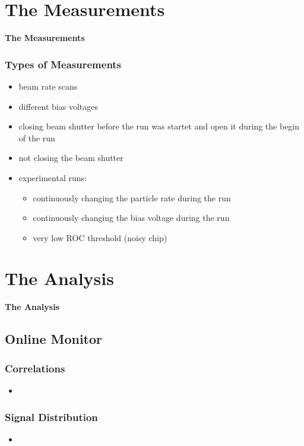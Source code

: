 \documentclass[9pt]{beamer}
\begin{document}
\section{The Measurements}
\begin{frame}
	\begin{alertblock}{
		\begin{center}
			\Large{\textbf{The Measurements}}
		\end{center}}
	\end{alertblock}
\end{frame}
\begin{frame}
	\frametitle{Types of Measurements}
	\begin{itemize}
		\item beam rate scans
		\item different bias voltages
		\item closing beam shutter before the run was startet and open it during the begin of the run
		\item not closing the beam shutter
		\item experimental runs:
		\begin{itemize}
			\item continuously changing the particle rate during the run
			\item continuously changing the bias voltage during the run
			\item very low ROC threshold (noisy chip)
		\end{itemize}
	\end{itemize}
\end{frame}
\section{The Analysis}
\begin{frame}
	\begin{alertblock}{
		\begin{center}
			\Large{\textbf{The Analysis}}
		\end{center}}
	\end{alertblock}
\end{frame}
\subsection{Online Monitor}
\begin{frame}
	\frametitle{Correlations}
	\begin{itemize}
		\item
	\end{itemize}
\end{frame}
\begin{frame}
	\frametitle{Signal Distribution}
	\begin{itemize}
		\item
	\end{itemize}
\end{frame}
\end{document}
